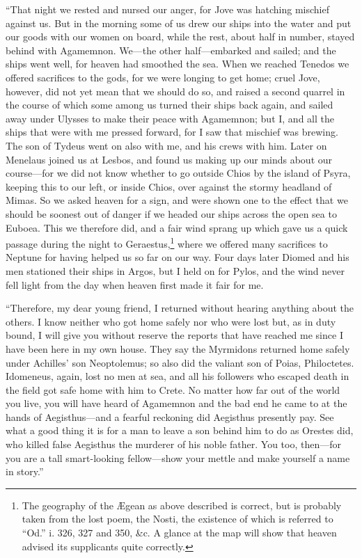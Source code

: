 “That night we rested and nursed our anger, for Jove was hatching mischief
against us. But in the morning some of us drew our ships into the water and put
our goods with our women on board, while the rest, about half in number, stayed
behind with Agamemnon. We—the other half—embarked and sailed; and the ships
went well, for heaven had smoothed the sea. When we reached Tenedos we offered
sacrifices to the gods, for we were longing to get home; cruel Jove, however,
did not yet mean that we should do so, and raised a second quarrel in the
course of which some among us turned their ships back again, and sailed away
under Ulysses to make their peace with Agamemnon; but I, and all the ships that
were with me pressed forward, for I saw that mischief was brewing. The son of
Tydeus went on also with me, and his crews with him. Later on Menelaus joined
us at Lesbos, and found us making up our minds about our course—for we did not
know whether to go outside Chios by the island of Psyra, keeping this to our
left, or inside Chios, over against the stormy headland of Mimas. So we asked
heaven for a sign, and were shown one to the effect that we should be soonest
out of danger if we headed our ships across the open sea to Euboea. This we
therefore did, and a fair wind sprang up which gave us a quick passage during
the night to Geraestus,\footnote{The geography of the Ægean as above described is correct, but is probably
taken from the lost poem, the Nosti, the existence of which is referred to
“Od.” i. 326, 327 and 350, \&c. A glance at the map will show that heaven
advised its supplicants quite correctly.} where we offered many sacrifices to
Neptune for having helped us so far on our way. Four days later Diomed and his
men stationed their ships in Argos, but I held on for Pylos, and the wind never
fell light from the day when heaven first made it fair for me.

“Therefore, my dear young friend, I returned without hearing anything about the
others. I know neither who got home safely nor who were lost but, as in duty
bound, I will give you without reserve the reports that have reached me since I
have been here in my own house. They say the Myrmidons returned home safely
under Achilles’ son Neoptolemus; so also did the valiant son of Poias,
Philoctetes. Idomeneus, again, lost no men at sea, and all his followers who
escaped death in the field got safe home with him to Crete. No matter how far
out of the world you live, you will have heard of Agamemnon and the bad end he
came to at the hands of Aegisthus—and a fearful reckoning did Aegisthus
presently pay. See what a good thing it is for a man to leave a son behind him
to do as Orestes did, who killed false Aegisthus the murderer of his noble
father. You too, then—for you are a tall smart-looking fellow—show your mettle
and make yourself a name in story.”

